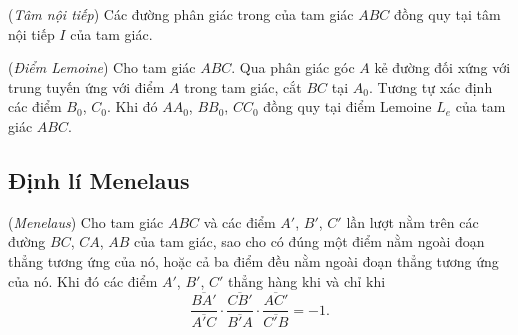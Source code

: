         \begin{corollary}
            (\textit{Tâm nội tiếp}) Các đường phân giác trong của tam giác \(ABC\) đồng quy tại tâm nội tiếp \(I\) của tam giác.
        \end{corollary}

        \begin{corollary}
            (\textit{Điểm Lemoine}) Cho tam giác \(ABC\). Qua phân giác góc \(A\) kẻ đường đối xứng với trung tuyến ứng với điểm \(A\) trong tam giác, cắt \(BC\) tại \(A_0\). Tương tự xác định các điểm \(B_0\), \(C_0\). Khi đó \(AA_0\), \(BB_0\), \(CC_0\) đồng quy tại điểm Lemoine \(L_e\) của tam giác \(ABC\).
        \end{corollary}

    \subsection{Định lí Menelaus}

        \begin{theorem}
            (\textit{Menelaus}) Cho tam giác \(ABC\) và các điểm \(A'\), \(B'\), \(C'\) lần lượt nằm trên các đường \(BC\), \(CA\), \(AB\) của tam giác, sao cho có đúng một điểm nằm ngoài đoạn thẳng tương ứng của nó, hoặc cả ba điểm đều nằm ngoài đoạn thẳng tương ứng của nó. Khi đó các điểm \(A'\), \(B'\), \(C'\) thẳng hàng khi và chỉ khi
            \[\frac{\overline{BA'}}{\overline{A'C}} \cdot \frac{\overline{CB'}}{\overline{B'A}} \cdot \frac{\overline{AC'}}{\overline{C'B}} = -1.\]
        \end{theorem}

